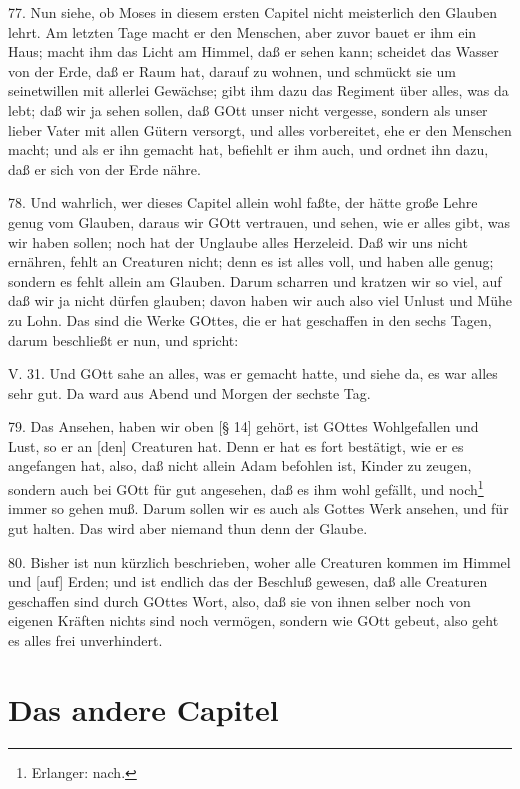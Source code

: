 77. Nun siehe, ob Moses in diesem ersten Capitel nicht meisterlich den Glauben lehrt. Am letzten Tage macht er den Menschen, aber zuvor bauet er ihm ein Haus; macht ihm das Licht am Himmel, daß er sehen kann; scheidet das Wasser von der Erde, daß er Raum hat, darauf zu wohnen, und schmückt sie um seinetwillen mit allerlei Gewächse; gibt ihm dazu das Regiment über alles, was da lebt; daß wir ja sehen sollen, daß GOtt unser nicht vergesse, sondern als unser lieber Vater mit allen Gütern versorgt, und alles vorbereitet, ehe er den Menschen macht; und als er ihn gemacht hat, befiehlt er ihm auch, und ordnet ihn dazu, daß er sich von der Erde nähre.

78. Und wahrlich, wer dieses Capitel allein wohl faßte, der hätte große Lehre genug vom Glauben, daraus wir GOtt vertrauen, und sehen, wie er alles gibt, was wir haben sollen; noch hat der Unglaube alles Herzeleid. Daß wir uns nicht ernähren, fehlt an Creaturen nicht; denn es ist alles voll, und haben alle genug; sondern es fehlt allein am Glauben. Darum scharren und kratzen wir so viel, auf daß wir ja nicht dürfen glauben; davon haben wir auch also viel Unlust und Mühe zu Lohn. Das sind die Werke GOttes, die er hat geschaffen in den sechs Tagen, darum beschließt er nun, und spricht:

\begin{schriftzitat}
V. 31. Und GOtt sahe an alles, was er gemacht hatte, und siehe da, es war alles sehr gut. Da ward aus Abend und Morgen der sechste Tag.
\end{schriftzitat}

79. Das Ansehen, haben wir oben [§ 14] gehört, ist GOttes Wohlgefallen und Lust, so er an [den] Creaturen hat. Denn er hat es fort bestätigt, wie er es angefangen hat, also, daß nicht allein Adam befohlen ist, Kinder zu zeugen, sondern auch bei GOtt für gut angesehen, daß es ihm wohl gefällt, und noch\footnote{Erlanger: nach.} immer so gehen muß. Darum sollen wir es auch als Gottes Werk ansehen, und für gut halten. Das wird aber niemand thun denn der Glaube.

80. Bisher ist nun kürzlich beschrieben, woher alle Creaturen kommen im Himmel und [auf] Erden; und ist endlich das der Beschluß gewesen, daß alle Creaturen geschaffen sind durch GOttes Wort, also, daß sie von ihnen selber noch von eigenen Kräften nichts sind noch vermögen, sondern wie GOtt gebeut, also geht es alles frei unverhindert.

\section{Das andere Capitel}


